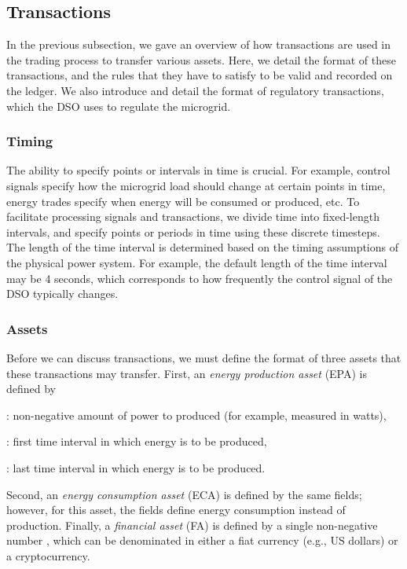 \subsection{Transactions}

In the previous subsection, we gave an overview of how transactions are used in the trading process to transfer various assets.
Here, we detail the format of these transactions, and the rules that they have to satisfy to be valid and recorded on the ledger.
We also introduce and detail the format of regulatory transactions, which the DSO uses to regulate the microgrid.

\subsubsection{Timing}

The ability to specify points or intervals in time is crucial.
For example, control signals specify how the microgrid load should change at certain points in time, energy trades specify when energy will be consumed or produced, etc.
To facilitate processing signals and transactions, we divide time into fixed-length intervals, and specify points or periods in time using these discrete timesteps.
The length of the time interval is determined based on the timing assumptions of the physical power system.
For example, the default length of the time interval may be 4 seconds, which corresponds to how frequently the control signal of the DSO typically changes.

\subsubsection{Assets}

Before we can discuss transactions, we must define the format of three assets that these transactions may transfer.
First, an \emph{energy production asset} (EPA) is defined by
\begin{compactitem}
\item {}: non-negative amount of power to produced (for example, measured in watts),
\item {}: first time interval in which energy is to be produced,
\item {}: last time interval in which energy is to be produced.
\end{compactitem}
Second, an \emph{energy consumption asset} (ECA) is defined by the same fields; however, for this asset, the fields define energy consumption instead of production.
Finally, a \emph{financial asset} (FA) is defined by a single non-negative number , which can be denominated in either a fiat currency (e.g., US dollars) or a cryptocurrency.

